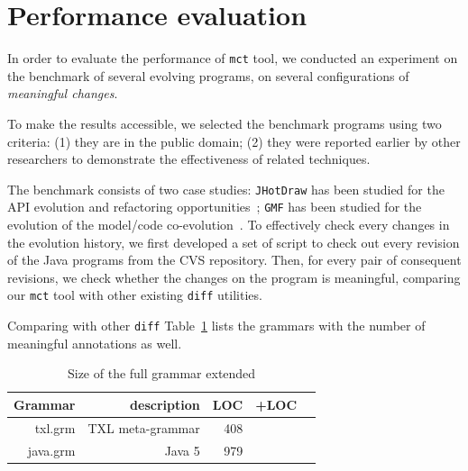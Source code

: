 \documentclass[10pt, conference, compsocconf]{IEEEtran}
\begin{document}
{\section{Performance evaluation}\label{sec:experiment}
In order to evaluate the performance of {\tt mct} tool, we conducted an experiment on the benchmark of several evolving programs, on several configurations of {\em meaningful changes}. 

To make the results accessible, we selected the benchmark programs using two criteria: (1) they are in the public domain; (2) they were reported earlier by other researchers to demonstrate the effectiveness of related techniques.

The benchmark consists of two case studies: {\tt JHotDraw} has been studied for the API evolution and refactoring opportunities~\cite{dig06ecoop}; {\tt GMF} has been studied for the evolution of the model/code co-evolution~\cite{GMF}.
To effectively check every changes in the evolution history, we first developed a set of script to check out every revision of
the Java programs from the CVS repository. Then, for every pair of consequent revisions, we check whether the changes on
the program is meaningful, comparing our {\tt mct} tool with other existing {\tt diff} utilities.

Comparing with other {\tt diff} Table~\ref{table:2} lists the grammars with the number of meaningful annotations as well.

\begin{table}
\caption{Size of the full grammar extended\label{table:2}}
\begin{tabular}{| r || r | r | r | r | }\hline
{\bf Grammar} & description & LOC & +LOC \\  \hline\hline
txl.grm & TXL meta-grammar & 408 &  \\ \hline
java.grm & Java 5 &  979 &   \\ \hline
\hline\end{tabular}
\end{table}

}
\end{document}
